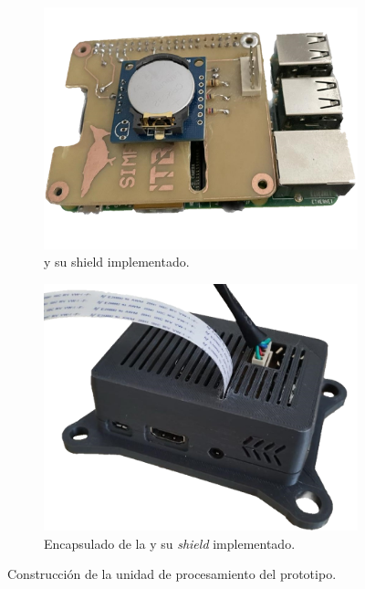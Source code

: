 \begin{figure}[H]
\centering
    	\begin{subfigure}{0.4\textwidth}
        	\centering
        	\includegraphics[width=\linewidth]{ImagenesConstruccion del prototipo/rpiyshield_prototipo}		
			\caption{\rspi y su shield implementado.}
			\label{fig:rpiyshield_prototipo}
        \end{subfigure}\hspace*{2cm}
        \begin{subfigure}{0.4\textwidth}
        	\centering
        	\includegraphics[width=\linewidth]{ImagenesConstruccion del prototipo/rpiyshield_encapsulado_prototipo}
        	\caption{Encapsulado de la \rspi y su \textit{shield} implementado.}
			\label{fig:casing_rpi}
        \end{subfigure}
	\caption{Construcción de la unidad de procesamiento del prototipo.}
	\label{fig:up_prototipo}
\end{figure}

